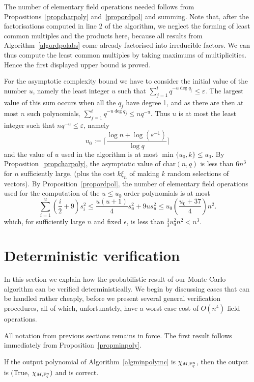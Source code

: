 The number of elementary field operations needed follows from 
Propositions~\ref{propcharpoly} and~\ref{propordpol} and summing. Note that,
after the factorisations computed in line 2 of the algorithm, we neglect
the forming of least common multiples and the products here, because
all results from Algorithm~\ref{algordpolabs} come already factorised
into irreducible factors. We can thus compute the least common multiples
by taking maximums of multiplicities. Hence the first displayed upper
bound is proved.

For the asymptotic complexity bound we have to consider the initial value of the number $u$,
namely the least integer $u$ such that $\sum_{j=1}^t q^{-u \deg q_j} \le \varepsilon$.
The largest value of this sum occurs when all the $q_j$ have degree 1, and as there are 
then at most $n$ such polynomials,  $\sum_{j=1}^t q^{-u \deg q_j}\le nq^{-u}$. 
Thus $u$ is at most the least integer such that $nq^{-u}\le \varepsilon$, namely 
\[
u_0:=\lceil \frac{\log n + \log (\varepsilon^{-1})}{\log q}\rceil
\]
and the value of $u$ used in the algorithm is at most $\min\{u_0,k\}\leq u_0$.
By Proposition~\ref{propcharpoly}, the asymptotic value of char$(n,q)$ is
less than $6n^3$ for $n$ sufficiently large, (plus the cost $k\xi_n$ 
of making $k$ random selections of vectors). 
By Proposition~\ref{propordpol},  the number of elementary
field operations used for the computation of the  $u\le u_0$ order polynomials
is at most
\[
\sum_{i=1}^u(\frac{i}{2}+9)s_i^2 \leq \frac{u(u+1)}{4}s_u^2+9us_u^2
\le u_0\left(\frac{u_0+37}{4}\right) n^2.
\]
which, for sufficiently large $n$ and fixed $\epsilon$, is less than
$\frac{1}{3}u_0^2n^2<n^3$.
\proofend

\section{Deterministic verification}
\label{verify}

In this section we explain how the probabilistic result of our Monte Carlo
algorithm can be verified deterministically. We begin by discussing cases
that can be handled rather cheaply, before we present several general verification procedures, all of which, unfortunately, have a worst-case cost of $O(n^4)$ field operations.

All notation from previous sections remains in force. The first result 
follows immediately from Proposition~\ref{propminpoly}.

\begin{Prop}
If the output polynomial of Algorithm~\ref{algminpolymc} is  $\chi_{M,\mathbb{F}_q^n}$,
then the output is $(${\sc True}, $\chi_{M,\mathbb{F}_q^n})$
and is correct.
\end{Prop}

